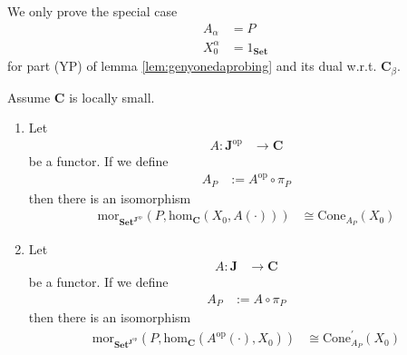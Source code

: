 We only prove the special case
\begin{align*}
  A_{\alpha}
  &=
  P
  \\
  X_{0}^{\alpha}
  &=
  1_{\mathbf{Set}}
\end{align*}
for part (YP) of lemma \ref{lem:genyonedaprobing} and its dual w.r.t. $\mathbf{C}_{\beta}$.
\\
\begin{lem}
\label{lem:elemyonedaprobing}
Assume $\mathbf{C}$ is locally small.
\begin{enumerate}
\item[(YP)]
Let
\begin{align*}
  A
  \colon
  \mathbf{J}^{\textrm{op}}
  &\rightarrow
  \mathbf{C}
\end{align*}
be a functor.
If we define
\begin{align*}
  A_{P}
  &:=
  A^{\textrm{op}}
  \circ
  \pi_{P}
\end{align*}
then there is an isomorphism
\begin{align*}
  \mathrm{mor}_{\mathbf{Set}^{\mathbf{J}^{\textrm{op}}}}
  \left(
    P,
    \mathrm{hom}_{\mathbf{C}}
    \left(
      X_{0},
      A(\cdot)
    \right)
  \right)
  &\cong
  \mathrm{Cone}_{A_{P}}(X_{0})
\end{align*}
\item[(YP$_{\mathbf{C}}^{\prime}$)]
Let
\begin{align*}
  A
  \colon
  \mathbf{J}
  &\rightarrow
  \mathbf{C}
\end{align*}
be a functor.
If we define
\begin{align*}
  A_{P}
  &:=
  A
  \circ
  \pi_{P}
\end{align*}
then there is an isomorphism
\begin{align*}
  \mathrm{mor}_{\mathbf{Set}^{\mathbf{J}^{\textrm{op}}}}
  \left(
    P,
    \mathrm{hom}_{\mathbf{C}}
    \left(
      A^{\textrm{op}}(\cdot),
      X_{0}
    \right)
  \right)
  &\cong
  \mathrm{Cone}_{A_{P}}^{\prime}(X_{0})
\end{align*}
\end{enumerate}
\end{lem}
